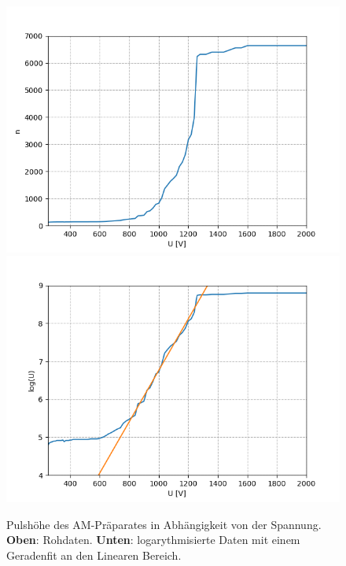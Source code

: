\documentclass[12pt,a4paper]{article}
\begin{document}
\begin{figure}
\centering
\includegraphics[scale=0.8]{Bilder/Prop/Am_Puls_lin.PNG}
\includegraphics[scale=0.8]{Bilder/Prop/Am_Puls_exp.PNG}
\caption{Pulshöhe des AM-Präparates in Abhängigkeit von der Spannung. \textbf{Oben}: Rohdaten. \textbf{Unten}: logarythmisierte Daten mit einem Geradenfit an den Linearen Bereich.}
\label{fig:AMPulse}
\end{figure}
\end{document}
